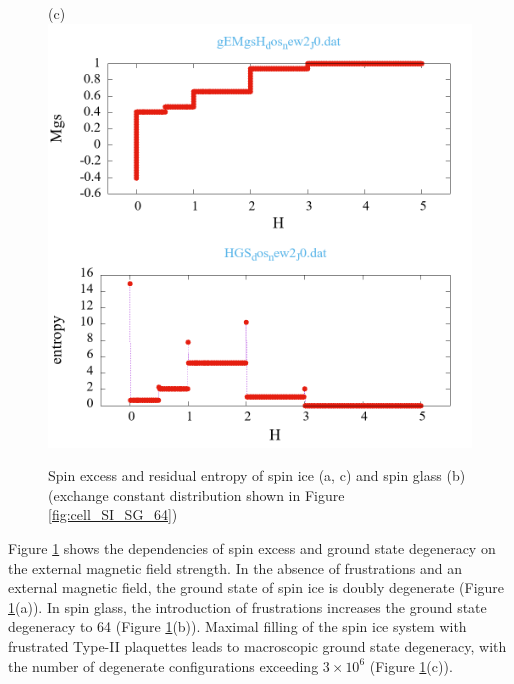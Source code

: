 \documentclass[utf8, babel, sor, jor, amsmath, amssymb, reprint]{elsarticle} %
\begin{document}
\begin{figure}[H]
\begin{minipage}[h]{0.32\linewidth}
	\end{minipage}
	\hfill
	\begin{minipage}[h]{0.32\linewidth}
		\centering(c)
		\includegraphics[width=1\linewidth]{pictures/_multiplot_SI64_J0}
	\end{minipage}
	
	\caption{Spin excess and residual entropy of spin ice (a, c) and spin glass (b) (exchange constant distribution shown in Figure \ref{fig:cell_SI_SG_64})}
	\label{fig:_multiplot_SI_SG_64}
	
\end{figure}


Figure \ref{fig:_multiplot_SI_SG_64} shows the dependencies of spin excess and ground state degeneracy on the external magnetic field strength.
In the absence of frustrations and an external magnetic field, the ground state of spin ice is doubly degenerate (Figure \ref{fig:_multiplot_SI_SG_64}(a)).
In spin glass, the introduction of frustrations increases the ground state degeneracy to 64 (Figure \ref{fig:_multiplot_SI_SG_64}(b)).
Maximal filling of the spin ice system with frustrated Type-II plaquettes leads to macroscopic ground state degeneracy, with the number of degenerate configurations exceeding $3\times10^{6}$ (Figure \ref{fig:_multiplot_SI_SG_64}(c)).
\end{document}

